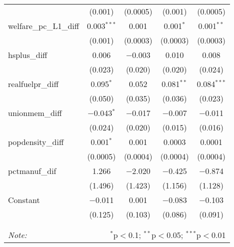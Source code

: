 \begin{table}[!htbp]
\begin{tabular}{@{\extracolsep{5pt}}lcccc}
  & (0.001) & (0.0005) & (0.001) & (0.0005) \\ 
  welfare\_pc\_L1\_diff & 0.003$^{***}$ & 0.001 & 0.001$^{*}$ & 0.001$^{**}$ \\ 
  & (0.001) & (0.0003) & (0.0003) & (0.0003) \\ 
  hsplus\_diff & 0.006 & $-$0.003 & 0.010 & 0.008 \\ 
  & (0.023) & (0.020) & (0.020) & (0.024) \\ 
  realfuelpr\_diff & 0.095$^{*}$ & 0.052 & 0.081$^{**}$ & 0.084$^{***}$ \\ 
  & (0.050) & (0.035) & (0.036) & (0.023) \\ 
  unionmem\_diff & $-$0.043$^{*}$ & $-$0.017 & $-$0.007 & $-$0.011 \\ 
  & (0.024) & (0.020) & (0.015) & (0.016) \\ 
  popdensity\_diff & 0.001$^{*}$ & 0.001 & 0.0003 & 0.0001 \\ 
  & (0.0005) & (0.0004) & (0.0004) & (0.0004) \\ 
  pctmanuf\_dif & 1.266 & $-$2.020 & $-$0.425 & $-$0.874 \\ 
  & (1.496) & (1.423) & (1.156) & (1.128) \\ 
  Constant & $-$0.011 & 0.001 & $-$0.083 & $-$0.103 \\ 
  & (0.125) & (0.103) & (0.086) & (0.091) \\ 
 \hline \\[-1.8ex] 
\hline 
\hline \\[-1.8ex] 
\textit{Note:}  & \multicolumn{4}{r}{$^{*}$p$<$0.1; $^{**}$p$<$0.05; $^{***}$p$<$0.01} \\ 
\end{tabular} 
\end{table} 
